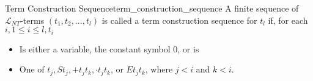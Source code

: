 \begin{definition}
{Term Construction Sequence}{term_construction_sequence}
A finite sequence of \(\mathcal{L}_{N T}\)-terms \(\left(t_{1}, t_{2}, \ldots,
t_{l}\right)\) is called a term construction sequence for \(t_{l}\) if, for each
\(i, 1 \leq i \leq l, t_{i}\) 
\begin{itemize}
    \item Is either a variable, the constant symbol 0, or is
    \item One of \(t_{j}, S t_{j},+t_{j} t_{k}, \cdot t_{j} t_{k}\), or  \(E t_{j} t_{k}\), where \(j<i\) and \(k<i\).
\end{itemize}
\end{definition}
